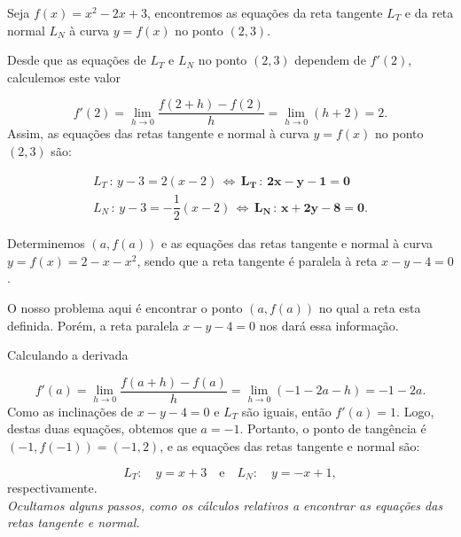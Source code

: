 \cleardoublepage\documentclass[../main.tex]{subfiles}
\begin{document}
\begin{ex}
  Seja \(f(x)=x^2-2x+3\), encontremos as equações da reta tangente \(L_T\) e da reta normal \(L_N\) à curva \(y=f(x)\) no ponto \((2,3)\).
  
  \begin{solution}
  Desde que as equações de \(L_T\) e \(L_N\) no ponto \((2,3)\) dependem de \(f'(2)\), calculemos este valor

\[ f'(2)=\lim\limits_{h\rightarrow 0}\dfrac{f(2+h)-f(2)}{h}=\lim\limits_{h\rightarrow 0}(h+2)= 2. \]
Assim, as equações das retas tangente e normal à curva \(y=f(x)\) no ponto \((2,3)\) são:

\[ \begin{array}{l} L_T\,:\,y-3=2(x-2)\,\Leftrightarrow\,\boldsymbol{L_T\,:\,2x-y-1=0}\\ L_N\,:\,y-3=-\dfrac{1}{2}(x-2)\,\Leftrightarrow\,\boldsymbol{L_N\,:\,x+2y-8=0}. \end{array} \]
  \end{solution}
\end{ex}
\begin{ex}
  Determinemos \((a,f(a))\) e as equações das retas tangente e normal à curva \(y=f(x)=2-x-x^2\), sendo que a reta tangente é paralela à reta \( x-y-4=0\).
  
  \begin{solution}
O nosso problema aqui é encontrar o ponto \((a,f(a))\) no qual a reta esta definida. Porém, a reta paralela \( x-y-4=0\) nos dará essa informação.

Calculando a derivada

\[ f'(a)=\lim\limits_{h\rightarrow 0}\dfrac{f(a+h)-f(a)}{h}=\lim\limits_{h\rightarrow 0}(-1-2a-h)= -1-2a. \]
Como as inclinações de \( x-y-4=0\) e \(L_T\) são iguais, então \(f'(a) =1\). Logo, destas duas equações, obtemos que \(a=-1\). Portanto, o ponto de tangência é \((-1,f(-1))=(-1,2)\), e as equações das retas tangente e normal são:

\[ L_T: \quad y=x+3\quad \mbox{e}\quad L_N: \quad y=-x+1, \]
respectivamente.\\
\dica \textit{Ocultamos alguns passos, como os cálculos relativos a encontrar as equações das retas tangente e normal.}
  \end{solution}
\end{ex}
\end{document}
